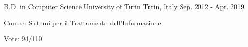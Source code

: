 


\begin{cventries}


\cventryy
{B.D. in Computer Science} %
{University of Turin} %
{Turin, Italy} %
{Sep. 2012 - Apr. 2019} %
{ %
	\begin{cvitems}
		\item {Course: Sistemi per il Trattamento dell'Informazione}
		\item {Vote: 94/110}
	\end{cvitems}
}


\end{cventries}

\bigbreak
